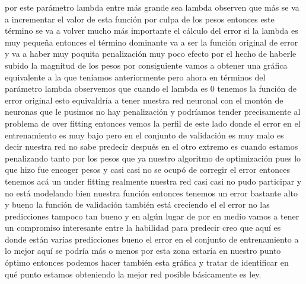 por este parámetro lambda entre más grande sea lambda observen que más se va a incrementar el valor de esta función por culpa de los pesos entonces este término se va a volver mucho más importante el cálculo del error si la lambda es muy pequeña entonces el término dominante va a ser la función original de error y va a haber muy poquita penalización muy poco efecto por el hecho de haberle subido la magnitud de los pesos por consiguiente vamos a obtener una gráfica equivalente a la que teníamos anteriormente pero ahora en términos del parámetro lambda observemos que cuando el lambda es 0 tenemos la función de error original esto equivaldría a tener nuestra red neuronal con el montón de neuronas que le pusimos no hay penalización y podríamos tender precisamente al problema de over fitting entonces vemos la perfil de este lado donde el error en el entrenamiento es muy bajo pero en el conjunto de validación es muy malo es decir nuestra red no sabe predecir después en el otro extremo es cuando estamos penalizando tanto por los pesos que ya nuestro algoritmo de optimización pues lo que hizo fue encoger pesos y casi casi no se ocupó de corregir el error entonces tenemos acá un under fitting realmente nuestra red casi casi no pudo participar y no está modelando bien nuestra función entonces tenemos un error bastante alto y bueno la función de validación también está creciendo el el error no las predicciones tampoco tan bueno y en algún lugar de por en medio vamos a tener un compromiso interesante entre la habilidad para predecir creo que aquí es donde están varias predicciones bueno el error en el conjunto de entrenamiento a lo mejor aquí se podría más o menos por esta zona estaría en nuestro punto óptimo entonces podemos hacer también esta gráfica y tratar de identificar en qué punto estamos obteniendo la mejor red posible básicamente es ley. 
